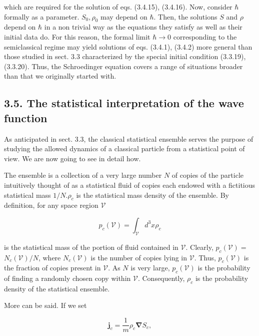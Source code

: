 \documentclass{article}
\begin{document}
which are required for the solution of eqs. (3.4.15), (3.4.16). Now, consider $\hbar$ formally as a parameter. $S_{0}, \rho_{0}$ may depend on $\hbar$. Then, the solutions $S$ and $\rho$ depend on $\hbar$ in a non trivial way as the equations they satisfy as well as their initial data do. For this reason, the formal limit $\hbar \rightarrow 0$ corresponding to the semiclassical regime may yield solutions of eqs. (3.4.1), (3.4.2) more general than those studied in sect. 3.3 characterized by the special initial condition (3.3.19), (3.3.20). Thus, the Schroedinger equation covers a range of situations broader than that we originally started with.

\subsection*{3.5. The statistical interpretation of the wave function}

As anticipated in sect. 3.3, the classical statistical ensemble serves the purpose of studying the allowed dynamics of a classical particle from a statistical point of view. We are now going to see in detail how.

The ensemble is a collection of a very large number $N$ of copies of the particle intuitively thought of as a statistical fluid of copies each endowed with a fictitious statistical mass $1 / N . \rho_{c}$ is the statistical mass density of the ensemble. By definition, for any space region $\mathcal{V}$
 
\begin{equation*}
p_{c}(\mathcal{V})=\int_{\mathcal{V}} d^{3} x \rho_{c} \tag{3.5.1}
\end{equation*}
 
is the statistical mass of the portion of fluid contained in $\mathcal{V}$. Clearly, $p_{c}(\mathcal{V})=$ $N_{c}(\mathcal{V}) / N$, where $N_{c}(\mathcal{V})$ is the number of copies lying in $\mathcal{V}$. Thus, $p_{c}(\mathcal{V})$ is the fraction of copies present in $\mathcal{V}$. As $N$ is very large,
$p_{c}(\mathcal{V})$ is the probability of finding a randomly chosen copy within $\mathcal{V}$. Consequently, $\rho_{c}$ is the probability density of the statistical ensemble.

More can be said. If we set
 
\begin{equation*}
\boldsymbol{j}_{c}=\frac{1}{m} \rho_{c} \boldsymbol{\nabla} S_{c}, \tag{3.5.2}
\end{equation*}
 
\end{document}
